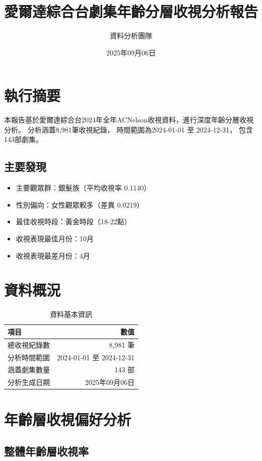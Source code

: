\documentclass[11pt,a4paper]{article}
\title{\textbf{\Large 愛爾達綜合台劇集年齡分層收視分析報告}}
\author{資料分析團隊}
\date{2025年09月06日}
\begin{document}
\maketitle

\tableofcontents
\newpage

\section{執行摘要}

本報告基於愛爾達綜合台2024年全年ACNelson收視資料，進行深度年齡分層收視分析。
分析涵蓋8,981筆收視紀錄，
時間範圍為2024-01-01 至 2024-12-31，
包含143部劇集。

\subsection{主要發現}
\begin{itemize}
    \item 主要觀眾群：銀髮族（平均收視率 0.1140）
    \item 性別偏向：女性觀眾較多（差異 0.0219）
    \item 最佳收視時段：黃金時段（18-22點）
    \item 收視表現最佳月份：10月
    \item 收視表現最差月份：4月
\end{itemize}

\section{資料概況}

\begin{table}[H]
\centering
\caption{資料基本資訊}
\begin{tabular}{lr}
\toprule
項目 & 數值 \\
\midrule
總收視紀錄數 & 8,981 筆 \\
分析時間範圍 & 2024-01-01 至 2024-12-31 \\
涵蓋劇集數量 & 143 部 \\
分析生成日期 & 2025年09月06日 \\
\bottomrule
\end{tabular}
\end{table}

\section{年齡層收視偏好分析}

\subsection{整體年齡層收視率}
\end{document}
